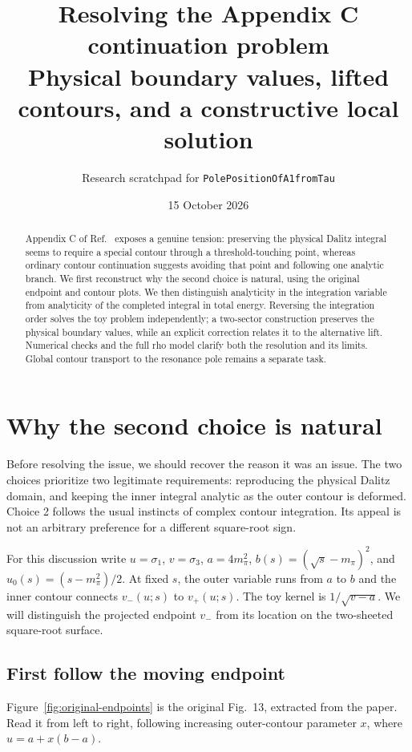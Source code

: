 \documentclass[11pt,a4paper]{article}
\title{Resolving the Appendix C continuation problem\\[3pt]\large Physical boundary values, lifted contours, and a constructive local solution}
\author{Research scratchpad for \texttt{PolePositionOfA1fromTau}}
\date{15 October 2026}
\begin{document}
\maketitle
\begin{abstract}
Appendix C of Ref.~\cite{paper} exposes a genuine tension: preserving the physical Dalitz integral seems to require a special contour through a threshold-touching point, whereas ordinary contour continuation suggests avoiding that point and following one analytic branch. We first reconstruct why the second choice is natural, using the original endpoint and contour plots. We then distinguish analyticity in the integration variable from analyticity of the completed integral in total energy. Reversing the integration order solves the toy problem independently; a two-sector construction preserves the physical boundary values, while an explicit correction relates it to the alternative lift. Numerical checks and the full rho model clarify both the resolution and its limits. Global contour transport to the resonance pole remains a separate task.
\end{abstract}


\section{Why the second choice is natural}
Before resolving the issue, we should recover the reason it was an issue. The two choices prioritize two legitimate requirements: reproducing the physical Dalitz domain, and keeping the inner integral analytic as the outer contour is deformed. Choice 2 follows the usual instincts of complex contour integration. Its appeal is not an arbitrary preference for a different square-root sign.

For this discussion write $u=\sigma_1$, $v=\sigma_3$, $a=4m_\pi^2$, $b(s)=(\sqrt{s}-m_\pi)^2$, and $u_0(s)=(s-m_\pi^2)/2$. At fixed $s$, the outer variable runs from $a$ to $b$ and the inner contour connects $v_-(u;s)$ to $v_+(u;s)$. The toy kernel is $1/\sqrt{v-a}$. We will distinguish the projected endpoint $v_-$ from its location on the two-sheeted square-root surface.

\subsection{First follow the moving endpoint}
Figure~\ref{fig:original-endpoints} is the original Fig.~13, extracted from the paper. Read it from left to right, following increasing outer-contour parameter $x$, where $u=a+x(b-a)$.
\end{document}
